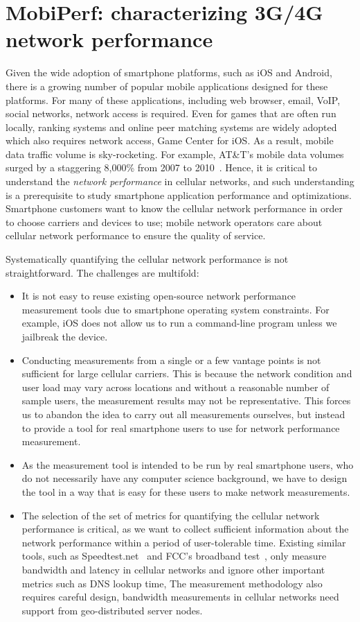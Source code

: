 \chapter{MobiPerf: characterizing 3G/4G network performance} \label{chap:net}

Given the wide adoption of smartphone platforms, such as iOS and Android, there is a growing number of popular mobile applications designed for these platforms. For many of these applications, including web browser, email, VoIP, social networks, network access is required. Even for games that are often run locally, ranking systems and online peer matching systems are widely adopted which also requires network access, \eg Game Center for iOS. As a result, mobile data traffic volume is sky-rocketing. For example, AT\&T's mobile data volumes surged by a staggering 8,000\% from 2007 to 2010~\cite{att.overload}. Hence, it is critical to understand the {\em network performance} in cellular networks, and such understanding is a prerequisite to study smartphone application performance and optimizations. Smartphone customers want to know the cellular network performance in order to choose carriers and devices to use; mobile network operators care about cellular network performance to ensure the quality of service.

Systematically quantifying the cellular network performance is not straightforward. The challenges are multifold:
\begin{itemize}
\item It is not easy to reuse existing open-source network performance measurement tools due to smartphone operating system constraints. For example, iOS does not allow us to run a command-line program unless we jailbreak the device.
\item Conducting measurements from a single or a few vantage points is not sufficient for large cellular carriers. This is because the network condition and user load may vary across locations and without a reasonable number of sample users, the measurement results may not be representative. This forces us to abandon the idea to carry out all measurements ourselves, but instead to provide a tool for real smartphone users to use for network performance measurement.
\item As the measurement tool is intended to be run by real smartphone users, who do not necessarily have any computer science background, we have to design the tool in a way that is easy for these users to make network measurements.
\item The selection of the set of metrics for quantifying the cellular network performance is critical, as we want to collect sufficient information about the network performance within a period of user-tolerable time. Existing similar tools, such as Speedtest.net~\cite{speedtestnet} 
and FCC's broadband test~\cite{fccspeedtest}, only measure bandwidth and latency in cellular networks and ignore other important metrics such as DNS lookup time, \etc The measurement methodology also requires careful design, \eg bandwidth measurements in cellular networks need support from geo-distributed server nodes.
\end{itemize}


